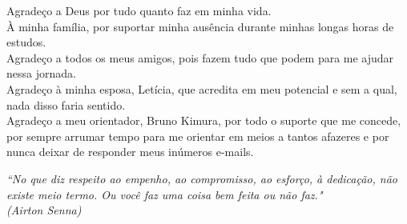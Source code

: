 \documentclass[	12pt, Times, openright, twoside, a4paper, english, brazil]{abntex2}
\begin{document}
\begin{agradecimentos}
Agradeço a Deus por tudo quanto faz em minha vida. 
\\À minha família, por suportar minha ausência durante minhas longas horas de estudos. 
\\Agradeço a todos os meus amigos, pois fazem tudo que podem para me ajudar nessa jornada. 
\\Agradeço à minha esposa, Letícia, que acredita em meu potencial e sem a qual, nada disso faria sentido. 
\\Agradeço a meu orientador, Bruno Kimura, por todo o suporte que me concede, por sempre arrumar tempo para me orientar em meios a tantos afazeres e por nunca deixar de responder meus inúmeros e-mails.


\end{agradecimentos}

\begin{epigrafe}
    \vspace*{\fill}
	\begin{flushright}
		\textit{``No que diz respeito ao empenho, ao compromisso, ao esforço, à dedicação, não existe meio termo. Ou você faz uma coisa bem feita ou não faz."\\(Airton Senna)}
	\end{flushright}
\end{epigrafe}

\end{document}
